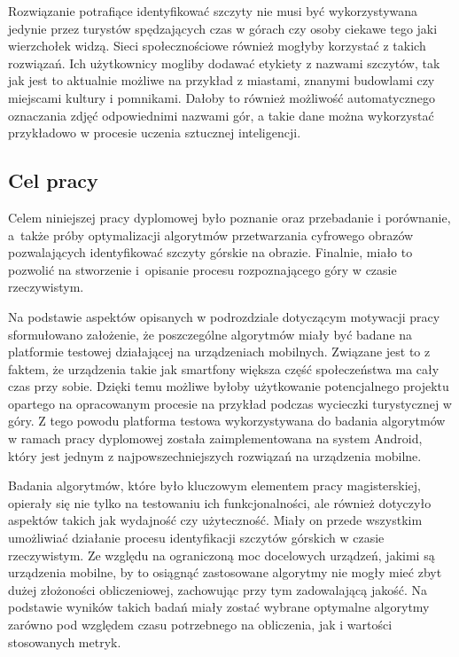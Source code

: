 Rozwiązanie potrafiące identyfikować szczyty nie musi być wykorzystywana jedynie przez turystów spędzających czas w górach czy osoby ciekawe tego jaki wierzchołek widzą. Sieci społecznościowe również mogłyby korzystać z takich rozwiązań. Ich użytkownicy mogliby dodawać etykiety z nazwami szczytów, tak jak jest to aktualnie możliwe na przykład z miastami, znanymi budowlami czy miejscami kultury i pomnikami. Dałoby to również możliwość automatycznego oznaczania zdjęć odpowiednimi nazwami gór, a takie dane można wykorzystać przykładowo w procesie uczenia sztucznej inteligencji. 


\subsection{Cel pracy}

Celem niniejszej pracy dyplomowej było poznanie oraz przebadanie i porównanie, a~także próby optymalizacji algorytmów przetwarzania cyfrowego obrazów pozwalających identyfikować szczyty górskie na obrazie. Finalnie, miało to pozwolić na stworzenie i~opisanie procesu rozpoznającego góry w czasie rzeczywistym.


Na podstawie aspektów opisanych w podrozdziale dotyczącym motywacji pracy sformułowano założenie, że poszczególne algorytmów miały być badane na platformie testowej działającej na urządzeniach mobilnych. Związane jest to z faktem, że urządzenia takie jak smartfony większa część społeczeństwa ma cały czas przy sobie. Dzięki temu możliwe byłoby użytkowanie potencjalnego projektu opartego na opracowanym procesie na przykład podczas wycieczki turystycznej w góry. Z tego powodu platforma testowa wykorzystywana do badania algorytmów w ramach pracy dyplomowej została zaimplementowana na system Android, który jest jednym z najpowszechniejszych rozwiązań na urządzenia mobilne.

Badania algorytmów, które było kluczowym elementem pracy magisterskiej, opierały się nie tylko na testowaniu ich funkcjonalności, ale również dotyczyło aspektów takich jak wydajność czy użyteczność. Miały on przede wszystkim umożliwiać działanie procesu identyfikacji szczytów górskich w czasie rzeczywistym. Ze względu na ograniczoną moc docelowych urządzeń, jakimi są urządzenia mobilne, by to osiągnąć zastosowane algorytmy nie mogły mieć zbyt dużej złożoności obliczeniowej, zachowując przy tym zadowalającą jakość. Na podstawie wyników takich badań miały zostać wybrane optymalne algorytmy zarówno pod względem czasu potrzebnego na obliczenia, jak i wartości stosowanych metryk.


